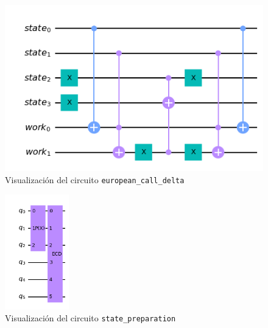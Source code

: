 \begin{figure}[h]
    \centering
    \includegraphics[width=\linewidth]{figures/notebooks/figura04.png}
    \caption{Visualización del circuito \texttt{european\_call\_delta}}
\end{figure}

\begin{figure}[h]
    \centering
    \includegraphics[height=5cm]{figures/notebooks/figura05.png}
    \caption{Visualización del circuito \texttt{state\_preparation}}
    \label{fig:my_label}
\end{figure}